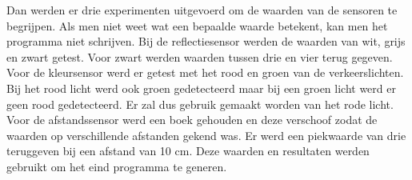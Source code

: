 \documentclass[a4paper,twoside,kulak]{kulakreport} %
\begin{document}
Dan werden er drie experimenten uitgevoerd om de waarden van de sensoren te begrijpen.
Als men niet weet wat een bepaalde waarde betekent, kan men het programma niet schrijven.
Bij de reflectiesensor werden de waarden van wit, grijs en zwart getest. 
Voor zwart werden waarden tussen drie en vier terug gegeven.  
Voor de kleursensor werd er getest met het rood en groen van de verkeerslichten.
Bij het rood licht werd ook groen gedetecteerd maar bij een groen licht werd er geen rood gedetecteerd.
Er zal dus gebruik gemaakt worden van het rode licht.
Voor de afstandssensor werd een boek gehouden en deze verschoof zodat de waarden op verschillende afstanden gekend was.
Er werd een piekwaarde van drie teruggeven bij een afstand van 10 cm. 
Deze waarden en resultaten werden gebruikt om het eind programma te generen.



\end{document}
